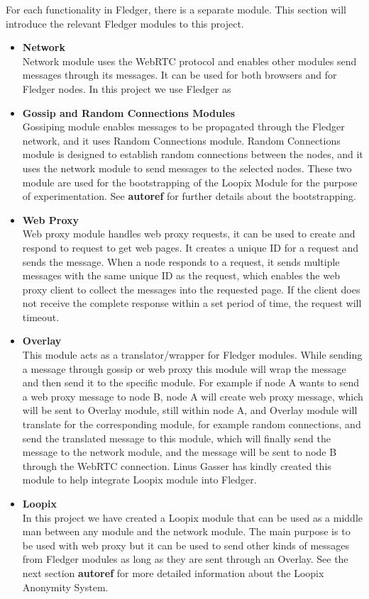 \documentclass[a4paper,11pt,oneside]{report}
\begin{document}
For each functionality in Fledger, there is a separate module. This section will introduce the relevant Fledger modules to this project.

\begin{itemize}
    \item \textbf{Network} \\
    Network module uses the WebRTC protocol and enables other modules send messages through its messages. It can be used for both browsers and for Fledger nodes. In this project we use Fledger as 
    \item \textbf{Gossip and Random Connections Modules} \\
    Gossiping module enables messages to be propagated through the Fledger network, and it uses Random Connections module. Random Connections module is designed to establish random connections between the nodes, and it uses the network module to send messages to the selected nodes. These two module are used for the bootstrapping of the Loopix Module for the purpose of experimentation. See \textbf{autoref} for further details about the bootstrapping.
    \item \textbf{Web Proxy} \\
    Web proxy module handles web proxy requests, it can be used to create and respond to request to get web pages. It creates a unique ID for a request and sends the message. When a node responds to a request, it sends multiple messages with the same unique ID as the request, which enables the web proxy client to collect the messages into the requested page. If the client does not receive the complete response within a set period of time, the request will timeout.
    \item \textbf{Overlay} \\
    This module acts as a translator/wrapper for Fledger modules. While sending a message through gossip or web proxy this module will wrap the message and then send it to the specific module. For example if node A wants to send a web proxy message to node B, node A will create web proxy message, which will be sent to Overlay module, still within node A, and Overlay module will translate for the corresponding module, for example random connections, and send the translated message to this module, which will finally send the message to the network module, and the message will be sent to node B through the WebRTC connection. Linus Gasser has kindly created this module to help integrate Loopix module into Fledger.
    \item \textbf{Loopix} \\
    In this project we have created a Loopix module that can be used as a middle man between any module and the network module. The main purpose is to be used with web proxy but it can be used to send other kinds of messages from Fledger modules as long as they are sent through an Overlay. See the next section \textbf{autoref} for more detailed information about the Loopix Anonymity System. 
\end{itemize}
\end{document}
